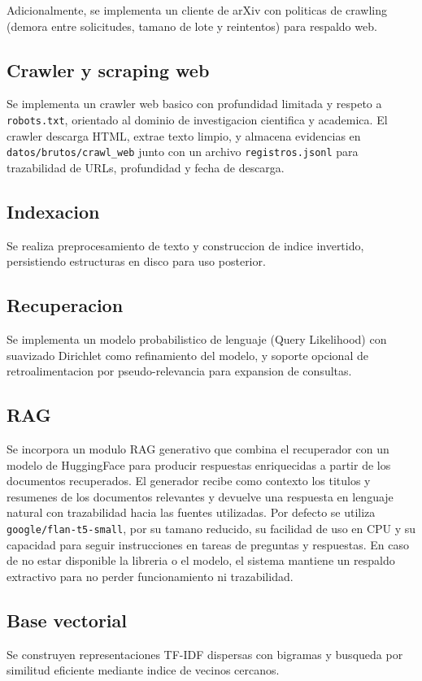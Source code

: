 \documentclass[runningheads]{llncs}
\begin{document}
Adicionalmente, se implementa un cliente de arXiv con politicas de crawling
(demora entre solicitudes, tamano de lote y reintentos) para respaldo web.

\subsection{Crawler y scraping web}
Se implementa un crawler web basico con profundidad limitada y respeto a
\texttt{robots.txt}, orientado al dominio de investigacion cientifica y academica.
El crawler descarga HTML, extrae texto limpio, y almacena evidencias en
\texttt{datos/brutos/crawl\_web} junto con un archivo \texttt{registros.jsonl}
para trazabilidad de URLs, profundidad y fecha de descarga.

\subsection{Indexacion}
Se realiza preprocesamiento de texto y construccion de indice invertido,
persistiendo estructuras en disco para uso posterior.

\subsection{Recuperacion}
Se implementa un modelo probabilistico de lenguaje (Query Likelihood) con
suavizado Dirichlet como refinamiento del modelo, y soporte opcional de
retroalimentacion por pseudo-relevancia para expansion de consultas.

\subsection{RAG}
Se incorpora un modulo RAG generativo que combina el recuperador con un
modelo de HuggingFace para producir respuestas enriquecidas a partir de los
documentos recuperados. El generador recibe como contexto los titulos y
resumenes de los documentos relevantes y devuelve una respuesta en lenguaje
natural con trazabilidad hacia las fuentes utilizadas. Por defecto se utiliza
\texttt{google/flan-t5-small}, por su tamano reducido, su facilidad de uso en
CPU y su capacidad para seguir instrucciones en tareas de preguntas y
respuestas. En caso de no estar disponible la libreria o el modelo, el sistema
mantiene un respaldo extractivo para no perder funcionamiento ni trazabilidad.

\subsection{Base vectorial}
Se construyen representaciones TF-IDF dispersas con bigramas y busqueda por
similitud eficiente mediante indice de vecinos cercanos.
\end{document}
